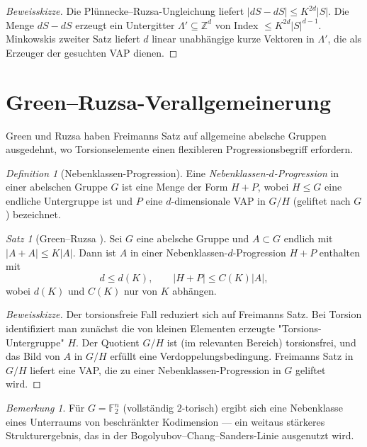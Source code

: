 \documentclass[12pt,a4paper]{amsart}
\theoremstyle{definition}
\theoremstyle{remark}
\newtheorem{satz}[theorem]{Satz}
\newtheorem{bemerkung}[theorem]{Bemerkung}
\newtheorem{definition_de}[theorem]{Definition}
\newcommand{\F}{\mathbb{F}}
\newcommand{\Z}{\mathbb{Z}}
\begin{document}
\begin{proof}[Beweisskizze]
Die Plünnecke--Ruzsa-Ungleichung liefert $|dS - dS| \leq K^{2d}|S|$.
Die Menge $dS - dS$ erzeugt ein Untergitter $\Lambda' \subseteq \Z^d$ von Index
$\leq K^{2d}|S|^{d-1}$. Minkowskis zweiter Satz liefert $d$ linear unabhängige
kurze Vektoren in $\Lambda'$, die als Erzeuger der gesuchten VAP dienen.
\end{proof}

\section{Green--Ruzsa-Verallgemeinerung}\label{sec:green_ruzsa}

Green und Ruzsa \cite{GreenRuzsa2007} haben Freimanns Satz auf allgemeine abelsche
Gruppen ausgedehnt, wo Torsionselemente einen flexibleren Progressionsbegriff
erfordern.

\begin{definition_de}[Nebenklassen-Progression]
Eine \emph{Nebenklassen-$d$-Progression} in einer abelschen Gruppe $G$ ist eine
Menge der Form $H + P$, wobei $H \leq G$ eine endliche Untergruppe ist und $P$
eine $d$-dimensionale VAP in $G/H$ (geliftet nach $G$) bezeichnet.
\end{definition_de}

\begin{satz}[Green--Ruzsa \cite{GreenRuzsa2007}]\label{satz:green_ruzsa}
Sei $G$ eine abelsche Gruppe und $A \subset G$ endlich mit $|A + A| \leq K|A|$.
Dann ist $A$ in einer Nebenklassen-$d$-Progression $H + P$ enthalten mit
\[
  d \leq d(K), \qquad |H + P| \leq C(K)|A|,
\]
wobei $d(K)$ und $C(K)$ nur von $K$ abhängen.
\end{satz}

\begin{proof}[Beweisskizze]
Der torsionsfreie Fall reduziert sich auf Freimanns Satz. Bei Torsion identifiziert
man zunächst die von kleinen Elementen erzeugte "Torsions-Untergruppe" $H$. Der
Quotient $G/H$ ist (im relevanten Bereich) torsionsfrei, und das Bild von $A$ in
$G/H$ erfüllt eine Verdoppelungsbedingung. Freimanns Satz in $G/H$ liefert eine
VAP, die zu einer Nebenklassen-Progression in $G$ geliftet wird.
\end{proof}

\begin{bemerkung}
Für $G = \F_2^n$ (vollständig $2$-torisch) ergibt sich eine Nebenklasse eines
Unterraums von beschränkter Kodimension — ein weitaus stärkeres Strukturergebnis,
das in der Bogolyubov--Chang--Sanders-Linie ausgenutzt wird.
\end{bemerkung}
\end{document}

